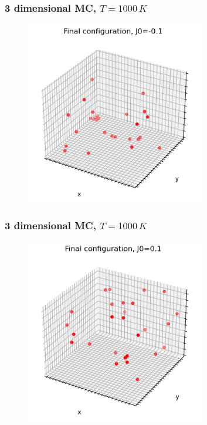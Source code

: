 \documentclass{beamer}
\begin{document}
\begin{frame}
\frametitle{3 dimensional MC, $T=1000\,K$}



\begin{figure}
    \includegraphics[width=0.7\textwidth]{images/dfinalconf1.png}
\end{figure}

\end{frame}

\begin{frame}
    \frametitle{3 dimensional MC, $T=1000\,K$}

 

    \begin{figure}
        \includegraphics[width=0.7\textwidth]{images/dfinalconf2.png}
    \end{figure}

\end{frame}
\end{document}
